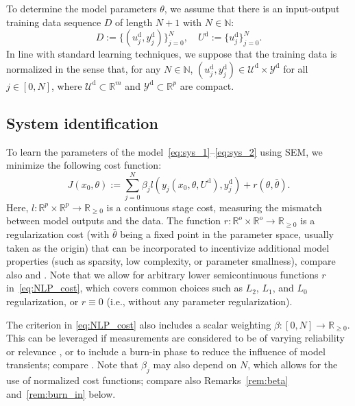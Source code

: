 \documentclass[a4paper,fleqn]{cas-dc}
\begin{document}
To determine the model parameters $\theta$, we assume that there is an input-output training data sequence $D$ of length $N+1$ with $N\in\mathbb{N}$:
\begin{equation}\label{eq:Di}
	D := \{({u}_{j}^\mathrm{d},{y}_{j}^\mathrm{d})\}_{j=0}^N, \quad U^\mathrm{d} := \{u^\mathrm{d}_{j}\}_{j=0}^N.
\end{equation}
In line with standard learning techniques, we suppose that the training data is normalized in the sense that, for any $N\in\mathbb{N}$, $({u}_{j}^\mathrm{d},{y}_{j}^\mathrm{d})\in\mathcal{U}^\mathrm{d}\times\mathcal{Y}^\mathrm{d}$ for all $j\in[0,N]$, where $\mathcal{U}^\mathrm{d}\subset\mathbb{R}^{m}$ and $\mathcal{Y}^\mathrm{d}\subset\mathbb{R}^{p}$ are compact.


\subsection{System identification}
To learn the parameters of the model~\eqref{eq:sys_1}--\eqref{eq:sys_2} using SEM, we minimize the following cost function:
\begin{equation}\label{eq:NLP_cost}
	J(x_0,\theta) := \sum_{j=0}^N \beta_j l({y}_j(x_0,\theta,U^\mathrm{d}),{y}_{j}^\mathrm{d}) + r(\theta,\bar{\theta}).
\end{equation}
Here, $l:\mathbb{R}^p\times\mathbb{R}^p\rightarrow\mathbb{R}_{\geq0}$ is a continuous stage cost, measuring the mismatch between model outputs and the data. The function $r:\mathbb{R}^o\times\mathbb{R}^o\rightarrow \mathbb{R}_{\geq0}$ is a regularization cost (with $\bar{\theta}$ being a fixed point in the parameter space, usually taken as the origin) that can be incorporated to incentivize additional model properties (such as sparsity, low complexity, or parameter smallness), compare also \cite[Sec.~4, p.~221]{Ljung1999} and \cite{Pillonetto2025,Bemporad2023,Bemporad2025}. Note that we allow for arbitrary lower semicontinuous functions $r$ in~\eqref{eq:NLP_cost}, which covers common choices such as $L_2$, $L_1$, and $L_0$ regularization, or $r\equiv0$ (i.e., without any parameter regularization).

The criterion in \eqref{eq:NLP_cost} also includes a scalar weighting $\beta:[0,N]\rightarrow \mathbb{R}_{\geq0}$. This can be leveraged if measurements are considered to be of varying reliability or relevance \cite[Sec.~7.2]{Ljung1999}, or to include a burn-in phase to reduce the influence of model transients; compare \cite{Schiller2025b,Jaeger2002,Bonassi2022}.
Note that $\beta_j$ may also depend on $N$, which allows for the use of normalized cost functions; compare also Remarks~\ref{rem:beta} and~\ref{rem:burn_in} below.
\end{document}
